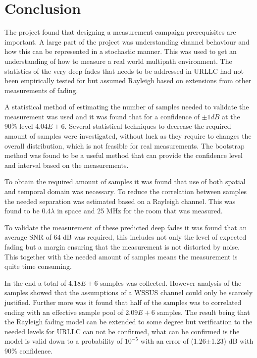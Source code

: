 \chapter{Conclusion}

The project found that designing a measurement campaign prerequisites are important. A large part of the project was understanding channel behaviour and how this can be represented in a stochastic manner. This was used to get an understanding of how to measure a real world multipath environment. The statistics of the very deep fades that needs to be addressed in \gls{URLLC} had not been empirically tested for but assumed Rayleigh based on extensions from other measurements of fading.

A statistical method of estimating the number of samples needed to validate the measurement was used and it was found that for a confidence of $\pm 1dB$ at the 90\% level $4.04E+6$. Several statistical techniques to decrease the required amount of samples were investigated, without luck as they require to changes the overall distribution, which is not feasible for real measurements. The bootstrap method was found to be a useful method that can provide the confidence level and interval based on the measurements.

To obtain the required amount of samples it was found that use of both spatial and temporal domain was necessary. To reduce the correlation between samples the needed separation was estimated based on a Rayleigh channel. This was found to be 0.4$\lambda$ in space and 25 MHz for the room that was measured. 


To validate the measurement of these predicted deep fades it was found that an average SNR of 64 dB was required, this includes not only the level of expected fading but a margin ensuring that the measurement is not distorted by noise. This together with the needed amount of samples means the measurement is quite time consuming. 

In the end a total of 4.18$E+6$ samples was collected. However analysis of the samples showed that the assumptions of a WSSUS channel could only be scarcely justified. Further more was it found that half of the samples was to correlated ending with an effective sample pool of 2.09$E+6$ samples. The result being that the Rayleigh fading model can be extended to some degree but verification to the needed levels for \gls{URLLC} can not be confirmed, what can be confirmed is the model is valid down to a probability of $10^{-5}$ with an error of (1.26$\pm$1.23) dB with 90\% confidence.

